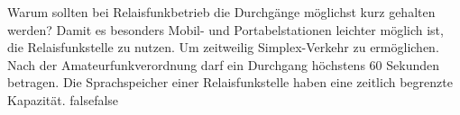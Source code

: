     {Warum sollten bei Relaisfunkbetrieb die Durchgänge möglichst kurz gehalten werden?}
    {Damit es besonders Mobil- und Portabelstationen leichter möglich ist, die Relaisfunkstelle zu nutzen.}
    {Um zeitweilig Simplex-Verkehr zu ermöglichen.}
    {Nach der Amateurfunkverordnung darf ein Durchgang höchstens 60 Sekunden betragen.}
    {Die Sprachspeicher einer Relaisfunkstelle haben eine zeitlich begrenzte Kapazität.}
    {false}{false}
